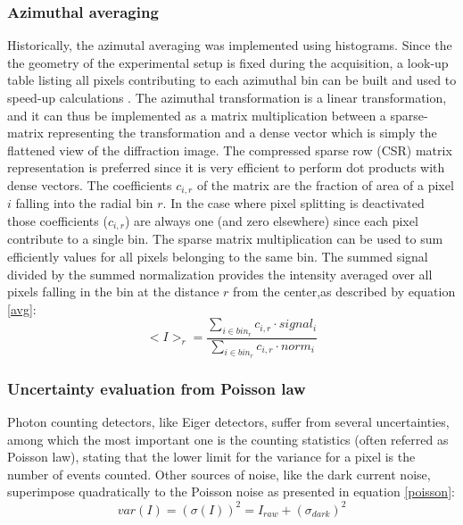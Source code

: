 \documentclass[preprint]{iucr}              %
\begin{document}
\subsubsection{Azimuthal averaging} 
Historically, the azimutal averaging was implemented using histograms. Since the the geometry of the experimental setup is fixed during the acquisition, a look-up table listing all pixels contributing to each  azimuthal bin can be built and used to speed-up calculations \cite{pyFAI_gpu}.
The azimuthal transformation is a linear transformation, and it can thus be implemented as a  matrix multiplication between a sparse-matrix representing the transformation and a dense vector which is simply the flattened view of the diffraction image. 
The compressed sparse row (CSR) matrix representation is preferred since it is very efficient to perform dot products with dense vectors.
The coefficients $c_{i,r}$ of the matrix are the fraction of area of a pixel $i$ falling into the radial bin $r$.
In the case where pixel splitting is deactivated those coefficients  ($c_{i,r}$) are always one (and zero elsewhere) since each pixel contribute to a single bin.
The sparse matrix multiplication can be used to sum efficiently values for all pixels belonging to the same bin.
The summed signal divided by the summed normalization provides the intensity averaged over all pixels falling in the bin at the distance $r$ from the center,as described by equation \ref{avg}: 
\begin{equation}
\label{avg}
<I>_{r} = \frac{\sum\limits_{i \in bin_r} c_{i,r} \cdot signal_i}
                        {\sum\limits_{i \in bin_r} c_{i,r} \cdot norm_i} 
\end{equation}  

\subsubsection{Uncertainty evaluation from Poisson law}
Photon counting detectors, like Eiger detectors, suffer from several uncertainties, among which the most important one is the counting statistics (often referred as Poisson law),
stating that the lower limit for the variance for a pixel is the number of events counted.
Other sources of noise, like the dark current noise,  superimpose quadratically to the Poisson noise as presented in equation \ref{poisson}:     
\begin{equation}
\label{poisson}
var(I) = (\sigma(I))^{2} = I_{raw} + (\sigma_{dark})^{2}  
\end{equation}
\end{document}
